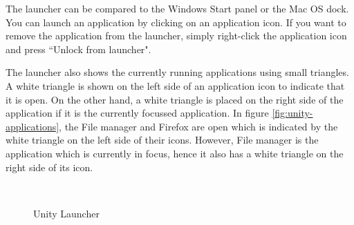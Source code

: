 \par \noindent The launcher can be compared to the Windows Start panel or the Mac OS dock. You can launch an application by clicking on an application icon. If you want to remove the application  from the launcher, simply right-click the application icon and press ``Unlock from launcher".\\

\par \noindent The launcher also shows the currently running applications using small triangles. A white triangle is shown on the left side of an application icon to indicate that it is open. On the other hand, a white triangle is placed on the right side of the application if it is the currently focussed application. In figure \ref{fig:unity-applications}, the File manager and Firefox are open which is indicated by the white triangle on the left side of their icons. However, File manager is the application which is currently in focus, hence it also has a white triangle on the right side of its icon.

\begin{figure}[h]	
		\centering		
		~ \hspace{1in}
		\caption{Unity Launcher}
		\label{fig:unity-app}
\end{figure}

